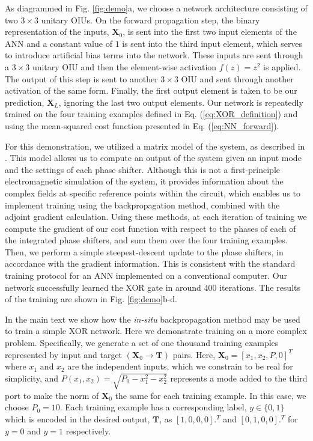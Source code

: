 As diagrammed in Fig. \ref{fig:demo}a, we choose a network architecture consisting of two $3 \times 3$ unitary OIUs.  On the forward propagation step, the binary representation of the inputs, $\textbf{X}_0$, is sent into the first two input elements of the ANN and a constant value of $1$ is sent into the third input element, which serves to introduce artificial bias terms into the network.  These inputs are sent through a $3 \times 3$ unitary OIU and then the element-wise activation $f(z) = z^2$ is applied.  The output of this step is sent to another $3 \times 3$ OIU and sent through another activation of the same form.  Finally, the first output element is taken to be our prediction, $\textbf{X}_L$, ignoring the last two output elements.  Our network is repeatedly trained on the four training examples defined in Eq. (\ref{eq:XOR_definition}) and using the mean-squared cost function presented in Eq. (\ref{eq:NN_forward}).

For this demonstration, we utilized a matrix model of the system, as described in \cite{Reck1994,Clements2016}.  This model allows us to compute an output of the system given an input mode and the settings of each phase shifter.  Although this is not a first-principle electromagnetic simulation of the system, it provides information about the complex fields at specific reference points within the circuit, which enables us to implement training using the backpropagation method, combined with the adjoint gradient calculation.  Using these methods, at each iteration of training we compute the gradient of  our cost function with respect to the phases of each of the integrated phase shifters, and sum them over the four training examples.  Then, we perform a simple steepest-descent update to the phase shifters, in accordance with the gradient information. This is consistent with the standard training protocol for an ANN implemented on a conventional computer.  Our network successfully learned the XOR gate in around 400 iterations. The results of the training are shown in Fig. \ref{fig:demo}b-d.

In the main text we show how the \textit{in-situ} backpropagation method may be used to train a simple XOR network.  Here we demonstrate training on a more complex problem. Specifically, we generate a set of one thousand training examples represented by input and target $(\mathbf{X}_0 \to \mathbf{T})$ pairs. Here, $\mathbf{X}_0 = [x_1, x_2, P, 0]^T$ where $x_1$ and $x_2$ are the independent inputs, which we constrain to be real for simplicity, and $P(x_1, x_2)= \sqrt{P_0-x_1^2-x_2^2}$ represents a mode added to the third port to make the norm of $\mathbf{X}_0$ the same for each training example.  In this case, we choose $P_0 = 10$.  Each training example has a corresponding label, $y \in \{0,1\}$ which is encoded in the desired output, $\mathbf{T}$, as $[1, 0, 0, 0].^T$ and $[0, 1, 0, 0].^T$ for $y = 0$ and $y=1$ respectively.

